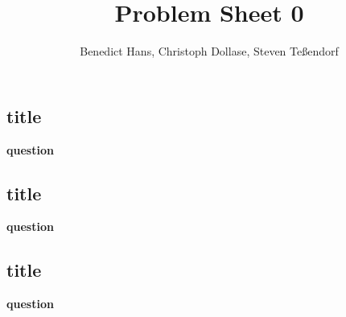 \documentclass[a4paper,12pt]{article}
\author{Benedict Hans, Christoph Dollase, Steven Te\ss endorf}
\title{ \textbf{Problem Sheet 0}}
\begin{document}
	 
	\maketitle	 %
	
	\subsection{title}
	\textbf{question}
	
	
	\subsection{title}
	\textbf{question}
	
	
	
	\subsection{title}
	\textbf{question}
	
	
\end{document}
